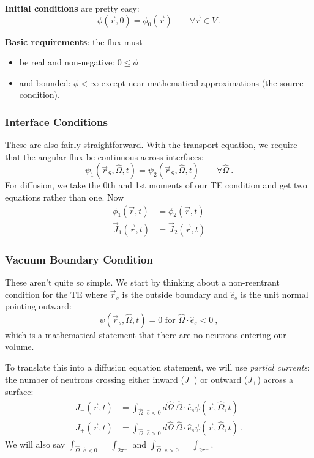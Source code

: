 \documentclass[12pt]{article}
\newcommand{\vOmega}{\ensuremath{\hat{\Omega}}}
\begin{document}
\textbf{Initial conditions} are pretty easy:
\[\phi(\vec{r}, 0) = \phi_0(\vec{r}) \qquad \forall \vec{r} \in V \:.\]

\textbf{Basic requirements}: the flux must
\begin{itemize}
\item be real and non-negative: $0 \leq \phi$
\item and bounded: $\phi < \infty$ except near mathematical approximations (the source condition). 
\end{itemize}

\subsubsection*{Interface Conditions}
These are also fairly straightforward. With the transport equation, we require that the angular flux be continuous across interfaces: 
\[\psi_1(\vec{r}_S, \vOmega, t) = \psi_2(\vec{r}_S,\vOmega, t)\qquad \forall \vOmega\:.\]
For diffusion, we take the 0th and 1st moments of our TE condition and get two equations rather than one. Now
\begin{align*}
\phi_1(\vec{r}, t) &= \phi_2(\vec{r}, t) \\
\vec{J}_1(\vec{r}, t) &= \vec{J}_2(\vec{r}, t)
\end{align*}

\subsubsection*{Vacuum Boundary Condition}
These aren't quite so simple. We start by thinking about a non-reentrant condition for the TE where $\vec{r}_s$ is the outside boundary and $\hat{e}_s$ is the unit normal pointing outward: 
\[\psi(\vec{r}_s, \vOmega, t) = 0 \text{ for } \vOmega \cdot \hat{e}_s < 0 \:,\]
%
which is a mathematical statement that there are no neutrons entering our volume. 

To translate this into a diffusion equation statement, we will use \textit{partial currents}: the number of neutrons crossing either inward ($J_{-}$) or outward ($J_{+}$) across a surface:
\begin{align*}
J_{-}(\vec{r},t) &= \int_{\vOmega \cdot \hat{e} < 0} d\vOmega \: \vOmega \cdot \hat{e}_s \psi(\vec{r}, \vOmega, t) \\
J_{+}(\vec{r},t) &= \int_{\vOmega \cdot \hat{e} > 0} d\vOmega \: \vOmega \cdot \hat{e}_s \psi(\vec{r}, \vOmega, t)\:.
\end{align*}
We will also say $\int_{\vOmega \cdot \hat{e} < 0} = \int_{2\pi^{-}}$ and  $\int_{\vOmega \cdot \hat{e} > 0} = \int_{2\pi^{+}}$. 
\end{document}
